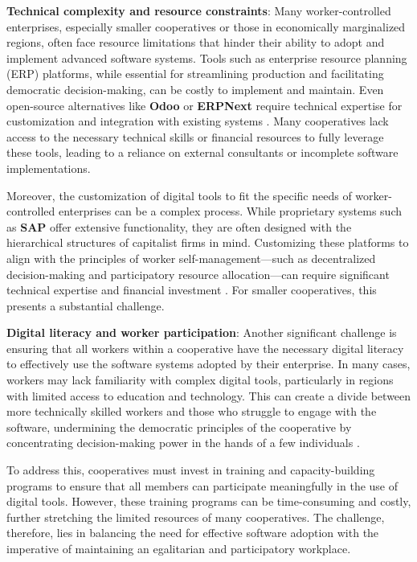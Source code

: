 \begin{refsection}
\textbf{Technical complexity and resource constraints}: Many worker-controlled enterprises, especially smaller cooperatives or those in economically marginalized regions, often face resource limitations that hinder their ability to adopt and implement advanced software systems. Tools such as enterprise resource planning (ERP) platforms, while essential for streamlining production and facilitating democratic decision-making, can be costly to implement and maintain. Even open-source alternatives like \textbf{Odoo} or \textbf{ERPNext} require technical expertise for customization and integration with existing systems \cite[pp.~201-205]{schweickart2011}. Many cooperatives lack access to the necessary technical skills or financial resources to fully leverage these tools, leading to a reliance on external consultants or incomplete software implementations.

Moreover, the customization of digital tools to fit the specific needs of worker-controlled enterprises can be a complex process. While proprietary systems such as \textbf{SAP} offer extensive functionality, they are often designed with the hierarchical structures of capitalist firms in mind. Customizing these platforms to align with the principles of worker self-management—such as decentralized decision-making and participatory resource allocation—can require significant technical expertise and financial investment \cite[pp.~134-138]{kasmir1996}. For smaller cooperatives, this presents a substantial challenge.

\textbf{Digital literacy and worker participation}: Another significant challenge is ensuring that all workers within a cooperative have the necessary digital literacy to effectively use the software systems adopted by their enterprise. In many cases, workers may lack familiarity with complex digital tools, particularly in regions with limited access to education and technology. This can create a divide between more technically skilled workers and those who struggle to engage with the software, undermining the democratic principles of the cooperative by concentrating decision-making power in the hands of a few individuals \cite[pp.~119-122]{akuno2017}.

To address this, cooperatives must invest in training and capacity-building programs to ensure that all members can participate meaningfully in the use of digital tools. However, these training programs can be time-consuming and costly, further stretching the limited resources of many cooperatives. The challenge, therefore, lies in balancing the need for effective software adoption with the imperative of maintaining an egalitarian and participatory workplace.


\end{refsection}
